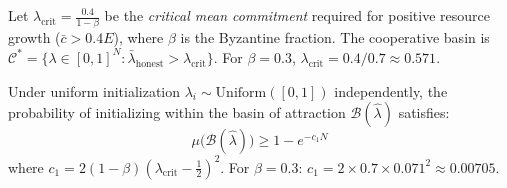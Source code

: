 \begin{definition}
\label{def:coop_basin}
Let $\lambda_{\mathrm{crit}} = \frac{0.4}{1 - \beta}$ be the \emph{critical mean
commitment} required for positive resource growth
($\bar{c} > 0.4E$), where $\beta$ is the Byzantine fraction.
The cooperative basin is
$\mathcal{C}^* = \{\lambda \in [0,1]^N : \bar{\lambda}_{\mathrm{honest}} >
\lambda_{\mathrm{crit}}\}$.
For $\beta = 0.3$, $\lambda_{\mathrm{crit}} = 0.4/0.7 \approx 0.571$.
\end{definition}

\begin{proposition}
\label{prop:basin_measure}
Under uniform initialization
$\lambda_i \sim \mathrm{Uniform}([0,1])$ independently,
the probability of initializing within the basin of attraction
$\mathcal{B}(\hat{\lambda})$ satisfies:
\[
  \mu\bigl(\mathcal{B}(\hat{\lambda})\bigr) \geq 1 - e^{-c_1 N}
\]
where $c_1 = 2(1-\beta)(\lambda_{\mathrm{crit}} - \tfrac{1}{2})^2$.
For $\beta = 0.3$: $c_1 = 2 \times 0.7 \times 0.071^2 \approx 0.00705$.
\end{proposition}

